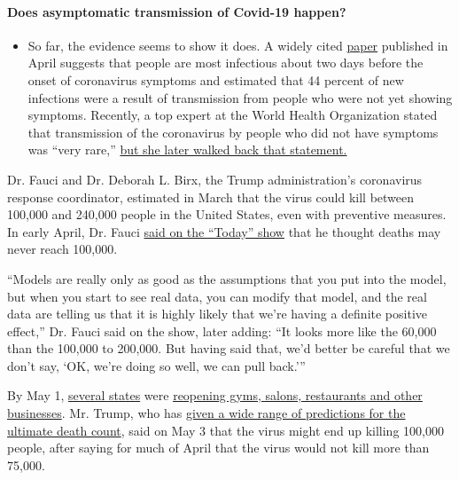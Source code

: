 \begin{itemize}
{  \paragraph{Does asymptomatic transmission of Covid-19
  happen?}\label{does-asymptomatic-transmission-of-covid-19-happen}}

  \begin{itemize}
  \tightlist
  \item
    So far, the evidence seems to show it does. A widely cited
    \href{https://www.nature.com/articles/s41591-020-0869-5}{paper}
    published in April suggests that people are most infectious about
    two days before the onset of coronavirus symptoms and estimated that
    44 percent of new infections were a result of transmission from
    people who were not yet showing symptoms. Recently, a top expert at
    the World Health Organization stated that transmission of the
    coronavirus by people who did not have symptoms was ``very rare,''
    \href{https://www.nytimes.com/2020/06/09/world/coronavirus-updates.html?action=click\&pgtype=Article\&state=default\&region=MAIN_CONTENT_3\&context=storylines_faq\#link-1f302e21}{but
    she later walked back that statement.}
  \end{itemize}
\end{itemize}

Dr. Fauci and Dr. Deborah L. Birx, the Trump administration's
coronavirus response coordinator, estimated in March that the virus
could kill between 100,000 and 240,000 people in the United States, even
with preventive measures. In early April, Dr. Fauci
\href{https://www.today.com/video/dr-anthony-fauci-virus-death-toll-may-be-more-like-60-000-than-100-000-to-200-000-81825861735}{said
on the ``Today'' show} that he thought deaths may never reach 100,000.

``Models are really only as good as the assumptions that you put into
the model, but when you start to see real data, you can modify that
model, and the real data are telling us that it is highly likely that
we're having a definite positive effect,'' Dr. Fauci said on the show,
later adding: ``It looks more like the 60,000 than the 100,000 to
200,000. But having said that, we'd better be careful that we don't say,
`OK, we're doing so well, we can pull back.'''

By May 1,
\href{https://www.nytimes.com/2020/04/20/us/coronavirus-us-hot-spots-reopening.html}{several
states} were
\href{https://www.nytimes.com/interactive/2020/us/states-reopen-map-coronavirus.html}{reopening
gyms, salons, restaurants and other businesses}. Mr. Trump, who has
\href{https://www.cnn.com/2020/05/04/politics/trump-rising-coronavirus-death-estimates/index.html}{given
a wide range of predictions for the ultimate death count}, said on May 3
that the virus might end up killing 100,000 people, after saying for
much of April that the virus would not kill more than 75,000.

